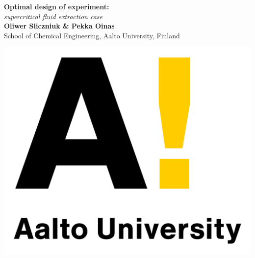 \documentclass[a0,portrait]{a0poster}
\begin{document}
\pagecolor{white!90!black}


\begin{minipage}[b]{0.75\linewidth}
\veryHuge \color{NavyBlue} \textbf{Optimal design of experiment:} \color{Black}\\ %
\Huge\textit{supercritical fluid extraction case}\\[2cm] %
\huge \textbf{Oliwer Sliczniuk \& Pekka Oinas}\\[0.5cm] %
\huge School of Chemical Engineering, Aalto University, Finland\\[0.4cm] %
\end{minipage}
%
\begin{minipage}[b]{0.25\linewidth}
\includegraphics[width=15cm]{Aalto_University_logo.png}\\ \\
\end{minipage}
\end{document}
